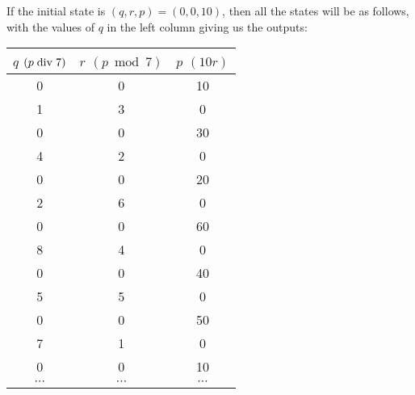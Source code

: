\documentclass[Book-Poly]{subfiles}
\begin{document}
\begin{exercise}
\begin{solution}
\begin{enumerate}
    If the initial state is $(q,r,p)=(0,0,10)$, then all the states will be as follows, with the values of $q$ in the left column giving us the outputs:
    \begin{table}[hbt!]
        \centering
        \footnotesize
        \begin{tabular}{c|c|c}
            $q$ $(p\bdiv7)$ & $r$ $(p\bmod7)$ & $p$ $(10r)$ \\
            \hline
            0 & 0 & 10 \\
            1 & 3 & 0 \\
            0 & 0 & 30 \\
            4 & 2 & 0 \\
            0 & 0 & 20 \\
            2 & 6 & 0 \\
            0 & 0 & 60 \\
            8 & 4 & 0 \\
            0 & 0 & 40 \\
            5 & 5 & 0 \\
            0 & 0 & 50 \\
            7 & 1 & 0 \\
            0 & 0 & 10 \\
            $\cdots$ & $\cdots$ & $\cdots$
        \end{tabular}
    \end{table}
\end{enumerate}
\end{solution}
\end{exercise}
\end{document}
